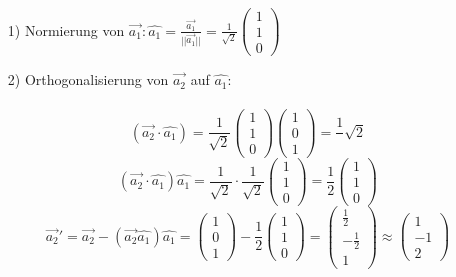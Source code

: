 \documentclass{article}
\begin{document}
\begin{itemize}
    \item[1)] Normierung von $\vec{a_1}: \hat{a_1}=\frac{\vec{a_1}}{||\vec{a_1}||}=\frac{1}{\sqrt{2}}\left(\begin{array}{c}1 \\ 1 \\ 0\end{array}\right)$
    \item[2)] Orthogonalisierung von $\vec{a_2}$ auf $\hat{a_1}$:\\\\
    \begin{equation*}
        \left(\vec{a_2}\cdot\hat{a_1}\right) = \frac{1}{\sqrt{2}}\left(\begin{array}{c}1 \\ 1 \\ 0\end{array}\right)\left(\begin{array}{c}1 \\ 0 \\ 1\end{array}\right)=\frac{1}{}\sqrt{2}
    \end{equation*}
    \begin{equation*}
        \left(\vec{a_2}\cdot\hat{a_1}\right)\hat{a_1}=\frac{1}{\sqrt{2}}\cdot\frac{1}{\sqrt{2}}\left(\begin{array}{c}1 \\ 1 \\ 0\end{array}\right)=\frac{1}{2}\left(\begin{array}{c}1 \\ 1 \\ 0\end{array}\right)
    \end{equation*}
    \begin{equation*}
        \vec{a_2}'=\vec{a_2}-\left(\vec{a_2}\hat{a_1}\right)\hat{a_1}=\left(\begin{array}{c}1 \\ 0 \\ 1\end{array}\right)-\frac{1}{2}\left(\begin{array}{c}1 \\ 1 \\ 0\end{array}\right)=\left(\begin{array}{c}\frac{1}{2} \\ -\frac{1}{2} \\ 1\end{array}\right) \approx \left(\begin{array}{c}1 \\ -1 \\ 2\end{array}\right)

\end{equation*}
\end{itemize}
\end{document}
